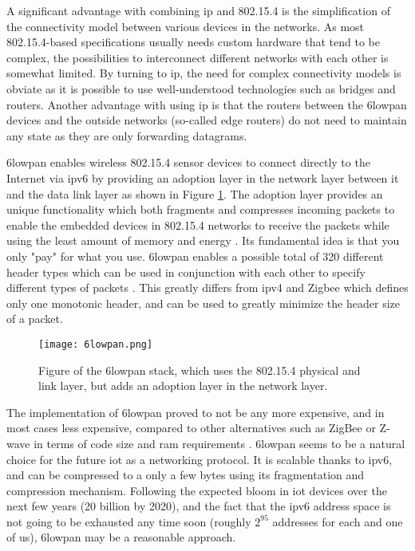 A significant advantage with combining \gls{ip} and 802.15.4 is the simplification of the connectivity model between various devices in the networks. As most 802.15.4-based specifications usually needs custom hardware that tend to be complex, the possibilities to interconnect different networks with each other is somewhat limited. By turning to \gls{ip}, the need for complex connectivity models is obviate as it is possible to use well-understood technologies such as bridges and routers. Another advantage with using \gls{ip} is that the routers between the \gls{6lowpan} devices and the outside networks (so-called edge routers) do not need to maintain any state as they are only forwarding datagrams.



\gls{6lowpan} enables wireless 802.15.4 sensor devices to connect directly to the Internet via \gls{ip}v6 by providing an adoption layer in the network layer between it and the data link layer as shown in Figure \ref{fig:6lowpan-stack}. The adoption layer provides an unique functionality which both fragments and compresses incoming packets to enable the embedded devices in 802.15.4 networks to receive the packets while using the least amount of memory and energy \cite{krentz20136lowpan}. Its fundamental idea is that you only "pay" for what you use. \gls{6lowpan} enables a possible total of 320 different header types which can be used in conjunction with each other to specify different types of packets \cite{rfc6282}. This greatly differs from \gls{ip}v4 and Zigbee which defines only one monotonic header, and can be used to greatly minimize the header size of a packet.


\begin{figure}[h]
	\centering
	\texttt{[image: 6lowpan.png]}
	\caption{Figure of the \gls{6lowpan} stack, which uses the 802.15.4 physical and link layer, but adds an adoption layer in the network layer.}
	\label{fig:6lowpan-stack}
\end{figure}


The implementation of \gls{6lowpan} proved to not be any more expensive, and in most cases less expensive, compared to other alternatives such as ZigBee or Z-wave in terms of code size and \gls{ram} requirements \cite{Mulligan2007}. \gls{6lowpan} seems to be a natural choice for the future \gls{iot} as a networking protocol. It is scalable thanks to \gls{ip}v6, and can be compressed to a only a few bytes using its fragmentation and compression mechanism. Following the expected bloom in \gls{iot} devices over the next few years (20 billion by 2020), and the fact that the \gls{ip}v6 address space is not going to be exhausted any time soon (roughly $2^{95}$ addresses for each and one of us), \gls{6lowpan} may be a reasonable approach.

